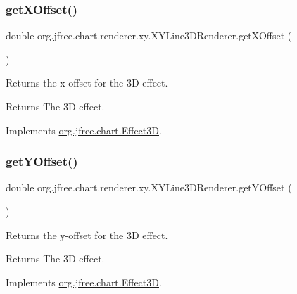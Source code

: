 \subsubsection{\texorpdfstring{get\+X\+Offset()}{getXOffset()}}
{\footnotesize\ttfamily double org.\+jfree.\+chart.\+renderer.\+xy.\+X\+Y\+Line3\+D\+Renderer.\+get\+X\+Offset (\begin{DoxyParamCaption}{ }\end{DoxyParamCaption})}

Returns the x-\/offset for the 3D effect.

\begin{DoxyReturn}{Returns}
The 3D effect. 
\end{DoxyReturn}


Implements \mbox{\hyperlink{interfaceorg_1_1jfree_1_1chart_1_1_effect3_d_af4f9829925a6d38170d817afd2486f90}{org.\+jfree.\+chart.\+Effect3D}}.

\mbox{\label{classorg_1_1jfree_1_1chart_1_1renderer_1_1xy_1_1_x_y_line3_d_renderer_a3515dadc0751fe1e43073c5f67cad3e1}} 
\subsubsection{\texorpdfstring{get\+Y\+Offset()}{getYOffset()}}
{\footnotesize\ttfamily double org.\+jfree.\+chart.\+renderer.\+xy.\+X\+Y\+Line3\+D\+Renderer.\+get\+Y\+Offset (\begin{DoxyParamCaption}{ }\end{DoxyParamCaption})}

Returns the y-\/offset for the 3D effect.

\begin{DoxyReturn}{Returns}
The 3D effect. 
\end{DoxyReturn}


Implements \mbox{\hyperlink{interfaceorg_1_1jfree_1_1chart_1_1_effect3_d_abcbf35b295e17395237fa4ed03dd9d8e}{org.\+jfree.\+chart.\+Effect3D}}.

\mbox{\label{classorg_1_1jfree_1_1chart_1_1renderer_1_1xy_1_1_x_y_line3_d_renderer_a3702ee5d68609c8b4ac0cbef2cb62f18}} 
